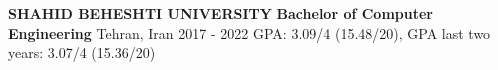 \begin{cventries}
    \cventry
    {\textbf {SHAHID BEHESHTI UNIVERSITY}}
    {\textbf {Bachelor of Computer Engineering}}
    {Tehran, Iran}
    {2017 - 2022}
    {GPA: 3.09/4 (15.48/20), GPA last two years: 3.07/4 (15.36/20)}
    
\end{cventries}